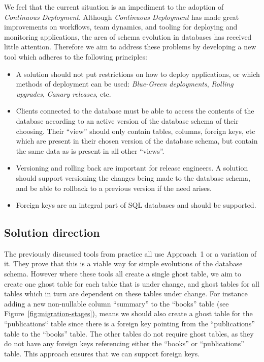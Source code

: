 \documentclass[conference]{IEEEtran}
\begin{document}
We feel that the current situation is an impediment to the adoption of \textit{Continuous Deployment}. Although \textit{Continuous Deployment} has made great improvements on workflows, team dynamics, and tooling for deploying and monitoring applications, the area of schema evolution in databases has received little attention. Therefore we aim to address these problems by developing a new tool which adheres to the following principles:

\begin{itemize}
  \item{A solution should not put restrictions on how to deploy applications, or which methods of deployment can be used: \textit{Blue-Green deployments}, \textit{Rolling upgrades}, \textit{Canary releases}, etc.}
  \item{Clients connected to the database must be able to access the contents of the database according to an active version of the database schema of their choosing. Their ``view'' should only contain tables, columns, foreign keys, etc which are present in their chosen version of the database schema, but contain the same data as is present in all other ``views''.}
  \item{Versioning and rolling back are important for release engineers. A solution should support versioning the changes being made to the database schema, and be able to rollback to a previous version if the need arises.}
  \item{Foreign keys are an integral part of SQL databases and should be supported.}
\end{itemize}

\subsection{Solution direction}

The previously discussed tools from practice all use Approach~1 or a variation of it. They prove that this is a viable way for simple evolutions of the database schema. However where these tools all create a single ghost table, we aim to create one ghost table for each table that is under change, and ghost tables for all tables which in turn are dependent on these tables under change. For instance adding a new non-nullable column ``summary'' to the ``books'' table (see Figure~\ref{fig:migration-stages}), means we should also create a ghost table for the ``publications`` table since there is a foreign key pointing from the ``publications'' table to the ``books'' table. The other tables do not require ghost tables, as they do not have any foreign keys referencing either the ``books'' or ``publications'' table. This approach ensures that we can support foreign keys.
\end{document}
